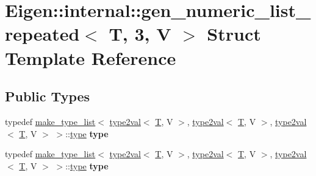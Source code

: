 \hypertarget{struct_eigen_1_1internal_1_1gen__numeric__list__repeated_3_01_t_00_013_00_01_v_01_4}{}\section{Eigen\+:\+:internal\+:\+:gen\+\_\+numeric\+\_\+list\+\_\+repeated$<$ T, 3, V $>$ Struct Template Reference}
\label{struct_eigen_1_1internal_1_1gen__numeric__list__repeated_3_01_t_00_013_00_01_v_01_4}
\subsection*{Public Types}
\begin{DoxyCompactItemize}
\item 
\mbox{\label{struct_eigen_1_1internal_1_1gen__numeric__list__repeated_3_01_t_00_013_00_01_v_01_4_ab4feaf854339a9fb0b03dd7036659066}} 
typedef \hyperlink{struct_eigen_1_1internal_1_1make__type__list}{make\+\_\+type\+\_\+list}$<$ \hyperlink{struct_eigen_1_1internal_1_1type2val}{type2val}$<$ \hyperlink{group___sparse_core___module}{T}, V $>$, \hyperlink{struct_eigen_1_1internal_1_1type2val}{type2val}$<$ \hyperlink{group___sparse_core___module}{T}, V $>$, \hyperlink{struct_eigen_1_1internal_1_1type2val}{type2val}$<$ \hyperlink{group___sparse_core___module}{T}, V $>$ $>$\+::\hyperlink{struct_eigen_1_1internal_1_1type__list}{type} {\bfseries type}
\item 
\mbox{\label{struct_eigen_1_1internal_1_1gen__numeric__list__repeated_3_01_t_00_013_00_01_v_01_4_ab4feaf854339a9fb0b03dd7036659066}} 
typedef \hyperlink{struct_eigen_1_1internal_1_1make__type__list}{make\+\_\+type\+\_\+list}$<$ \hyperlink{struct_eigen_1_1internal_1_1type2val}{type2val}$<$ \hyperlink{group___sparse_core___module}{T}, V $>$, \hyperlink{struct_eigen_1_1internal_1_1type2val}{type2val}$<$ \hyperlink{group___sparse_core___module}{T}, V $>$, \hyperlink{struct_eigen_1_1internal_1_1type2val}{type2val}$<$ \hyperlink{group___sparse_core___module}{T}, V $>$ $>$\+::\hyperlink{struct_eigen_1_1internal_1_1type__list}{type} {\bfseries type}
\end{DoxyCompactItemize}


